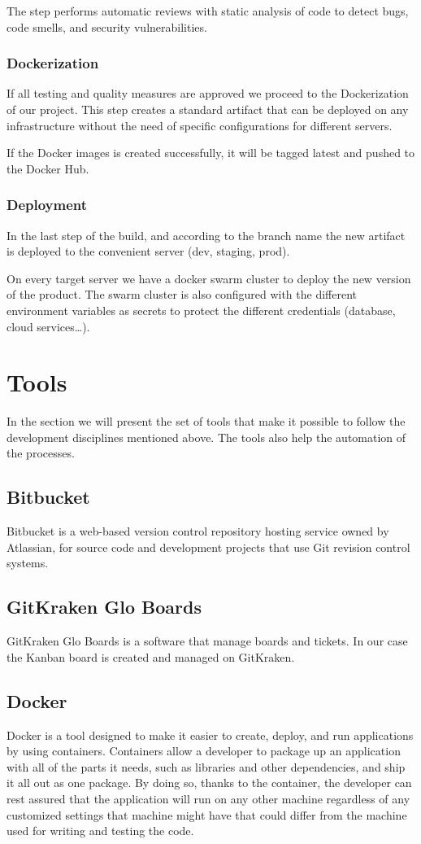 \begin{spacing}{1.2}
The step performs automatic reviews with static analysis of code to detect bugs, code smells, and security vulnerabilities.
\subsubsection{Dockerization}
If all testing and quality measures are approved we proceed to the Dockerization of our project.
This step creates a standard artifact that can be deployed on any infrastructure without the need of specific configurations for different servers. 

If the Docker images is created successfully, it will be tagged latest and pushed to the Docker Hub.

\subsubsection{Deployment}
In the last step of the build, and according to the branch name the new artifact is deployed to the convenient server (dev, staging, prod).

On every target server we have a docker swarm cluster to deploy the new version of the product.
The swarm cluster is also configured with the different environment variables as secrets to protect the different credentials (database, cloud services\dots).
\section{Tools}
In the section we will present the set of tools that make it possible to follow the development disciplines mentioned above. The tools also help the automation of the processes.
\subsection{Bitbucket}
Bitbucket is a web-based version control repository hosting service owned by Atlassian, for source code and development projects that use Git revision control systems.
\subsection{GitKraken Glo Boards}
GitKraken Glo Boards is a software that manage boards and tickets. In our case the Kanban board is created and managed on GitKraken.
\subsection{Docker}
Docker is a tool designed to make it easier to create, deploy, and run applications by using containers. Containers allow a developer to package up an application with all of the parts it needs, such as libraries and other dependencies, and ship it all out as one package. By doing so, thanks to the container, the developer can rest assured that the application will run on any other machine regardless of any customized settings that machine might have that could differ from the machine used for writing and testing the code.

\end{spacing}
